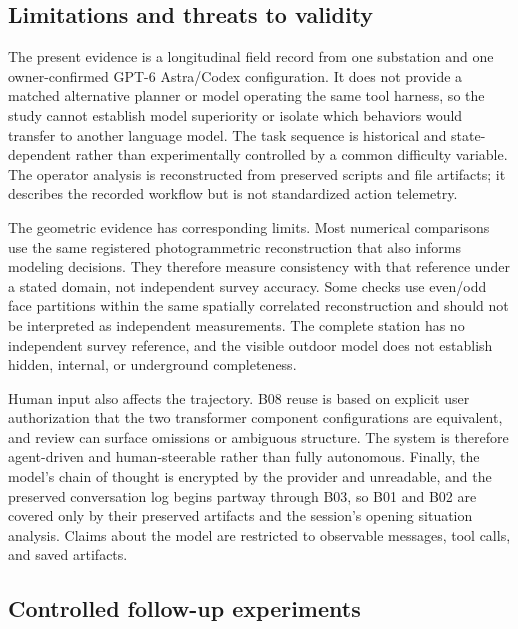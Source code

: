 \documentclass[10pt,a4paper]{article}
\begin{document}
\hypertarget{limitations-and-threats-to-validity}{%
\subsection{Limitations and threats to
validity}\label{limitations-and-threats-to-validity}}

The present evidence is a longitudinal field record from one substation
and one owner-confirmed GPT-6 Astra/Codex configuration. It does not
provide a matched alternative planner or model operating the same tool
harness, so the study cannot establish model superiority or isolate
which behaviors would transfer to another language model. The task
sequence is historical and state-dependent rather than experimentally
controlled by a common difficulty variable. The operator analysis is
reconstructed from preserved scripts and file artifacts; it describes
the recorded workflow but is not standardized action telemetry.

The geometric evidence has corresponding limits. Most numerical
comparisons use the same registered photogrammetric reconstruction that
also informs modeling decisions. They therefore measure consistency with
that reference under a stated domain, not independent survey accuracy.
Some checks use even/odd face partitions within the same spatially
correlated reconstruction and should not be interpreted as independent
measurements. The complete station has no independent survey reference,
and the visible outdoor model does not establish hidden, internal, or
underground completeness.

Human input also affects the trajectory. B08 reuse is based on explicit
user authorization that the two transformer component configurations are
equivalent, and review can surface omissions or ambiguous structure. The
system is therefore agent-driven and human-steerable rather than fully
autonomous. Finally, the model's chain of thought is encrypted by the
provider and unreadable, and the preserved conversation log begins
partway through B03, so B01 and B02 are covered only by their preserved
artifacts and the session's opening situation analysis. Claims about the
model are restricted to observable messages, tool calls, and saved
artifacts.

\hypertarget{controlled-follow-up-experiments}{%
\subsection{Controlled follow-up
experiments}\label{controlled-follow-up-experiments}}
\end{document}
